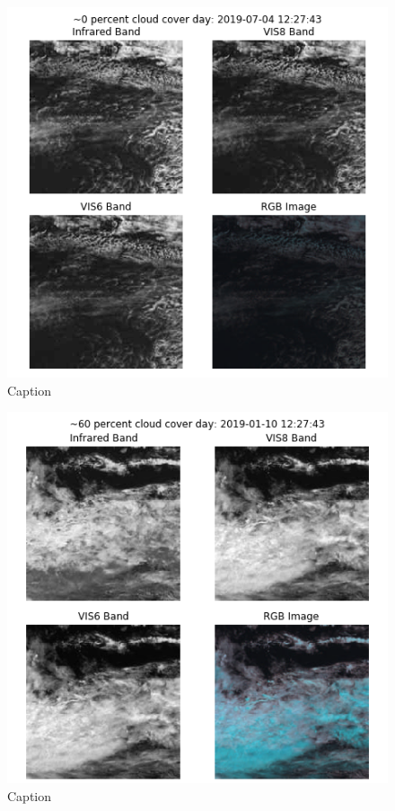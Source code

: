 \begin{figure}[h]
    \centering
    \includegraphics[totalheight=0.4\textheight]{0_per_day_sea.png}
    \caption{Caption}
    \label{fig:my_label}
\end{figure}


\begin{figure}[h]
    \centering
    \includegraphics[totalheight=0.4\textheight]{60_per_day_sea.png}
    \caption{Caption}
    \label{fig:my_label}
\end{figure}


